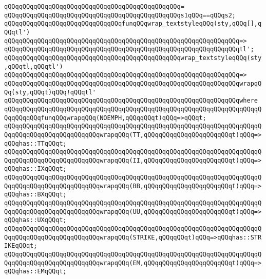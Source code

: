 \verb|qQQqqQQqqQQqqQQqqQQqqQQqqQQqqQQqqQQqqQQqqQQqqQQq=|\newline
\verb|qQQqqQQqqQQqqQQqqQQqqQQqqQQqqQQqqQQqqQQqqQQqqQQqs1qQQq==qQQqs2;|\newline
\newline
\newline
\verb|qQQqqQQqqQQqqQQqqQQqqQQqqQQqqQQqfunqQQqwrap_textstyleqQQq(sty,qQQq[],qQQqtl')|\newline
\verb|qQQqqQQqqQQqqQQqqQQqqQQqqQQqqQQqqQQqqQQqqQQqqQQqqQQqqQQqqQQqqQQq=>|\newline
\verb|qQQqqQQqqQQqqQQqqQQqqQQqqQQqqQQqqQQqqQQqqQQqqQQqqQQqqQQqqQQqqQQqtl';|\newline
\newline
\verb|qQQqqQQqqQQqqQQqqQQqqQQqqQQqqQQqqQQqqQQqqQQqqQQqwrap_textstyleqQQq(sty,qQQqtl,qQQqtl')|\newline
\verb|qQQqqQQqqQQqqQQqqQQqqQQqqQQqqQQqqQQqqQQqqQQqqQQqqQQqqQQqqQQqqQQq=>|\newline
\verb|qQQqqQQqqQQqqQQqqQQqqQQqqQQqqQQqqQQqqQQqqQQqqQQqqQQqqQQqqQQqqQQqwrapqQQq(sty,qQQqt)qQQq!qQQqtl'|\newline
\verb|qQQqqQQqqQQqqQQqqQQqqQQqqQQqqQQqqQQqqQQqqQQqqQQqqQQqqQQqqQQqqQQqwhere|\newline
\verb|qQQqqQQqqQQqqQQqqQQqqQQqqQQqqQQqqQQqqQQqqQQqqQQqqQQqqQQqqQQqqQQqqQQqqQQqqQQqqQQqfunqQQqwrapqQQq(NOEMPH,qQQqqQQqt)qQQq=>qQQqt;|\newline
\verb|qQQqqQQqqQQqqQQqqQQqqQQqqQQqqQQqqQQqqQQqqQQqqQQqqQQqqQQqqQQqqQQqqQQqqQQqqQQqqQQqqQQqqQQqqQQqqQQqwrapqQQq(TT,qQQqqQQqqQQqqQQqqQQqqQQqt)qQQq=>qQQqhas::TTqQQqt;|\newline
\verb|qQQqqQQqqQQqqQQqqQQqqQQqqQQqqQQqqQQqqQQqqQQqqQQqqQQqqQQqqQQqqQQqqQQqqQQqqQQqqQQqqQQqqQQqqQQqqQQqwrapqQQq(II,qQQqqQQqqQQqqQQqqQQqqQQqt)qQQq=>qQQqhas::IXqQQqt;|\newline
\verb|qQQqqQQqqQQqqQQqqQQqqQQqqQQqqQQqqQQqqQQqqQQqqQQqqQQqqQQqqQQqqQQqqQQqqQQqqQQqqQQqqQQqqQQqqQQqqQQqwrapqQQq(BB,qQQqqQQqqQQqqQQqqQQqqQQqt)qQQq=>qQQqhas::BXqQQqt;|\newline
\verb|qQQqqQQqqQQqqQQqqQQqqQQqqQQqqQQqqQQqqQQqqQQqqQQqqQQqqQQqqQQqqQQqqQQqqQQqqQQqqQQqqQQqqQQqqQQqqQQqwrapqQQq(UU,qQQqqQQqqQQqqQQqqQQqqQQqt)qQQq=>qQQqhas::UXqQQqt;|\newline
\verb|qQQqqQQqqQQqqQQqqQQqqQQqqQQqqQQqqQQqqQQqqQQqqQQqqQQqqQQqqQQqqQQqqQQqqQQqqQQqqQQqqQQqqQQqqQQqqQQqwrapqQQq(STRIKE,qQQqqQQqt)qQQq=>qQQqhas::STRIKEqQQqt;|\newline
\verb|qQQqqQQqqQQqqQQqqQQqqQQqqQQqqQQqqQQqqQQqqQQqqQQqqQQqqQQqqQQqqQQqqQQqqQQqqQQqqQQqqQQqqQQqqQQqqQQqwrapqQQq(EM,qQQqqQQqqQQqqQQqqQQqqQQqt)qQQq=>qQQqhas::EMqQQqt;|\newline
